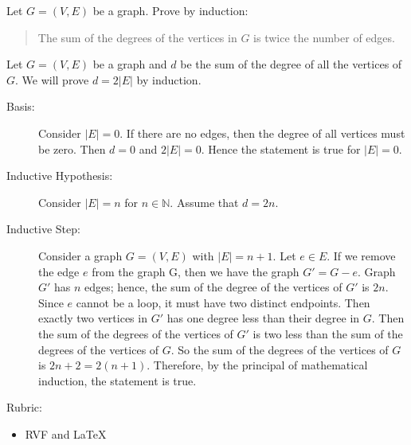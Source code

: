 \documentclass{article}
\newcommand{\N}{\mathbb{N}}
\theoremstyle{definition}
\begin{document}
\begin{question}
     Let $G=(V,E)$ be a graph. Prove by induction: 
\begin{quote}
The sum of the degrees of the vertices in $G$ is twice the number of edges.
\end{quote}	
\end{question}
\begin{solution}
Let $G=(V,E)$ be a graph and $d$ be the sum of the degree of all the vertices of $G$. We will prove $d=2|E|$ by induction.
\begin{description}
\item[Basis:] Consider $|E|=0$. If there are no edges, then the degree of all vertices must be zero. Then $d=0$ and $2|E|=0$. Hence the statement is true for $|E|=0$.
\item[Inductive Hypothesis:] Consider $|E|=n$ for $n\in \N$. Assume that $d=2n$.
\item[Inductive Step:] Consider a graph $G=(V,E)$ with $|E|=n+1$. Let $e\in E$. If we remove the edge $e$ from the graph G, then we have the graph $G'=G-e$. Graph $G'$ has $n$ edges; hence, the sum of the degree of the vertices of $G'$ is $2n$. Since $e$ cannot be a loop, it must have two distinct endpoints. Then exactly two vertices in $G'$ has one degree less than their degree in $G$. Then the sum of the degrees of the vertices of $G'$ is two less than the sum of the degrees of the vertices of $G$. So the sum of the degrees of the vertices of $G$ is $2n+2=2(n+1)$.
Therefore, by the principal of mathematical induction, the statement is true.
\end{description}

{\color{red} Rubric:
\begin{itemize}
\item RVF and \LaTeX
\end{itemize}}
\end{solution}
\end{document}
